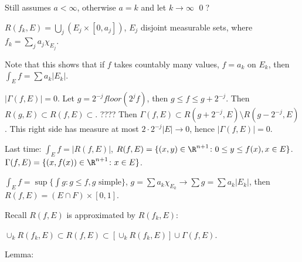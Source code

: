 Still assumes $a<\infty$, otherwise $a=k$ and let $k \to \infty$ \qed? \\





\begin{lem} \label{lem:1}
$R(f_k,E)= \bigcup_j (E_j \times [0,a_j])$, $E_j$ disjoint measurable sets, where $f_k = \sum_j a_j \chi_{E_j}$. 
\end{lem}



Note that this shows that if $f$ takes countably many values, $f=a_k$ on $E_k$, then $\int_E f = \sum a_k |E_k|$. 




\begin{lem} \label{lem:2}
$|\Gamma(f,E)|=0$. Let $g= 2^{-j} floor(2^jf)$, then $g \leq f \leq g+ 2^{-j}$. Then $R(g,E) \subset R(f,E) \subset $. ???? Then $\Gamma(f,E) \subset R(g+2^{-j}, E) \setminus R(g-2^{-j},E)$. This right side has measure at most $2\cdot 2^{-j} |E| \to 0$, hence $|\Gamma(f,E)|=0$. 
\end{lem}









Last time: $\int_E f= |R(f,E)|$, $R(f,E)= \{ (x,y) \in \R^{n+1} \colon 0 \leq y \leq f(x), x \in E\}$. $\Gamma(f,E)= \{ (x,f(x)) \in \R^{n+1} \colon x \in E\}$. 

$\int_E f= \sup \{ \int g \colon g \leq f, g \text{ simple}\}$, $g= \sum a_k \chi_{E_k} \to \sum g= \sum a_k |E_k|$, then $R(f,E)= (E \cap F) \times [0,1]$. 

Recall $R(f,E)$ is approximated by $R(f_k,E)$:

$\cup_k R(f_k,E) \subset R(f,E) \subset \left[ \cup_k R(f_k,E) \right] \cup \Gamma(f,E)$.


Lemma: 

















